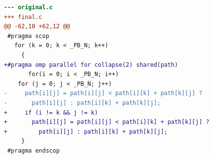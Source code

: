 \begin{lstlisting}[language=diff,basicstyle=\ttfamily\scriptsize,breaklines=true,caption={polybench/floyd-warshall — FASTER (pilot4)}]
--- original.c
+++ final.c
@@ -62,10 +62,12 @@
 #pragma scop
   for (k = 0; k < _PB_N; k++)
     {
+#pragma omp parallel for collapse(2) shared(path)
       for(i = 0; i < _PB_N; i++)
 	for (j = 0; j < _PB_N; j++)
-	  path[i][j] = path[i][j] < path[i][k] + path[k][j] ?
-	    path[i][j] : path[i][k] + path[k][j];
+	  if (i != k && j != k)
+	    path[i][j] = path[i][j] < path[i][k] + path[k][j] ?
+	      path[i][j] : path[i][k] + path[k][j];
     }
 #pragma endscop
 
\end{lstlisting}
